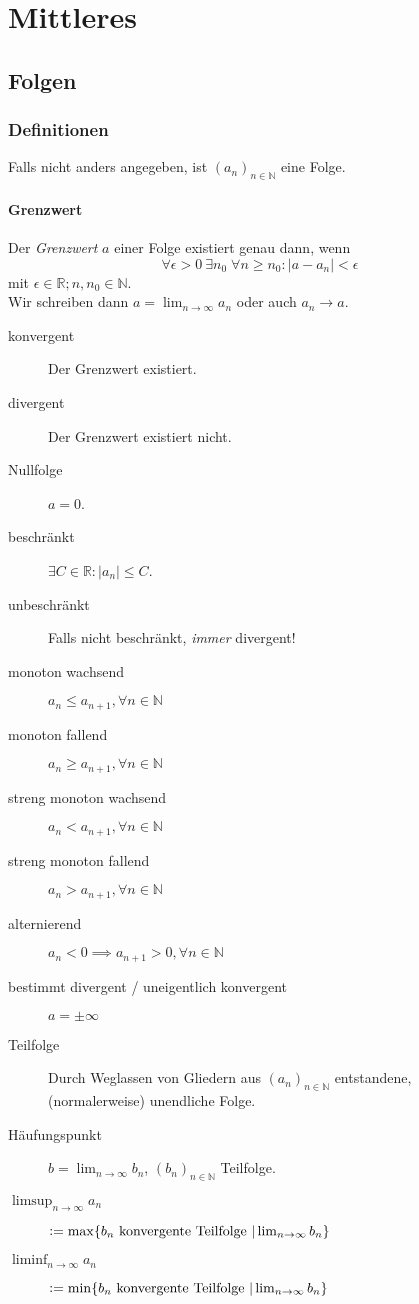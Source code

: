 \documentclass[a4paper, 9pt, DIV=24]{scrartcl}
\newcommand{\N}{\mathbb{N}}
\newcommand{\R}{\mathbb{R}}
\newcommand{\defeq}{\vcentcolon=}
\begin{document}
\clearpage
\section{Mittleres}

\subsection{Folgen}
\subsubsection{Definitionen}
Falls nicht anders angegeben, ist $(a_n)_{n\in\N}$ eine Folge.
\paragraph{Grenzwert}Der \emph{Grenzwert} $a$ einer Folge existiert genau dann,
wenn 
\[ \forall \epsilon > 0 \: \exists n_0 \; \forall n \geq n_0: |a - a_n| < \epsilon \]
mit $ \epsilon \in \R; n,n_0 \in\N  $. \\
Wir schreiben dann $a = \lim_{n\to\infty} a_n$ oder auch $a_n \to a$.
\begin{description}
 \item[konvergent] Der Grenzwert existiert.
 \item[divergent] Der Grenzwert existiert nicht.
 \item[Nullfolge] $a = 0$.
 \item[beschränkt] $\exists C\in\R: |a_n| \leq C$.
 \item[unbeschränkt] Falls nicht beschränkt, \emph{immer} divergent!
 \item[monoton wachsend] $a_n \leq a_{n+1}, \forall{n\in\N}$
 \item[monoton fallend] $a_n \geq a_{n+1}, \forall{n\in\N}$
 \item[streng monoton wachsend] $a_n < a_{n+1}, \forall{n\in\N}$
 \item[streng monoton fallend] $a_n > a_{n+1}, \forall{n\in\N}$
 \item[alternierend] $a_n < 0 \implies a_{n+1} > 0, \forall{n\in\N}$
 \item[bestimmt divergent / uneigentlich konvergent] $a = \pm \infty$
 \item[Teilfolge] Durch Weglassen von Gliedern aus $(a_n)_{n\in\N}$ entstandene, (normalerweise) unendliche Folge.
 \item[Häufungspunkt] $b = \lim_{n\to\infty} b_n$, $(b_n)_{n\in\N}$ Teilfolge.
 \item[$\limsup_{n\to\infty}a_n$]$\defeq\max\{b_n\text{ konvergente Teilfolge } | \lim_{n\to\infty} b_n\}$
 \item[$\liminf_{n\to\infty}a_n$]$\defeq\min\{b_n\text{ konvergente Teilfolge } | \lim_{n\to\infty} b_n\}$
\end{description}
\end{document}
